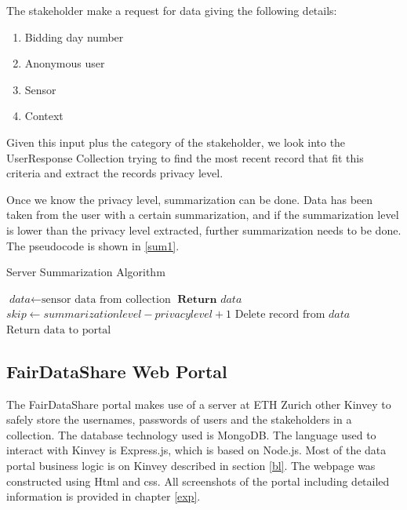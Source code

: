 The stakeholder make a request for data giving the following details:
\begin{enumerate}
    \item Bidding day number
    \item Anonymous user
    \item Sensor
    \item Context
\end{enumerate}

Given this input plus the category of the stakeholder, we look into the UserResponse Collection trying to find the most recent record that
fit this criteria and extract the records privacy level.

Once we know the privacy level, summarization can be done. Data has been taken from the user with a certain summarization, and if the summarization level is lower than the privacy level extracted, further summarization needs to be done. The pseudocode is shown in \ref{sum1}.

\begin{algorithm}
\caption{Server Summarization Algorithm}\label{sum1}
\begin{algorithmic}[1]
\State $\textit{data} \gets \text{sensor data from collection}$
	\State $\textbf{Return }\textit{data}$
\Else
	\State $\textit{skip} \gets \textit{summarizationlevel}-\textit{privacylevel}+1$
 	 \State $\text{Delete record from}\textit{ data}$
 	 \EndFor
\EndIf
\State $\text{Return data to portal}$
\EndProcedure
\end{algorithmic}
\end{algorithm}



\subsection{FairDataShare Web Portal}
The FairDataShare portal makes use of a server at ETH Zurich other Kinvey to safely store the usernames, passwords of users and the stakeholders in a collection. The database technology used is MongoDB. The language used to interact with Kinvey is Express.js, which is based on Node.js. Most of the data portal business logic is on Kinvey described in section \ref{bl}. The webpage was constructed using Html and css. All screenshots of the portal including detailed information is provided in chapter \ref{exp}.









